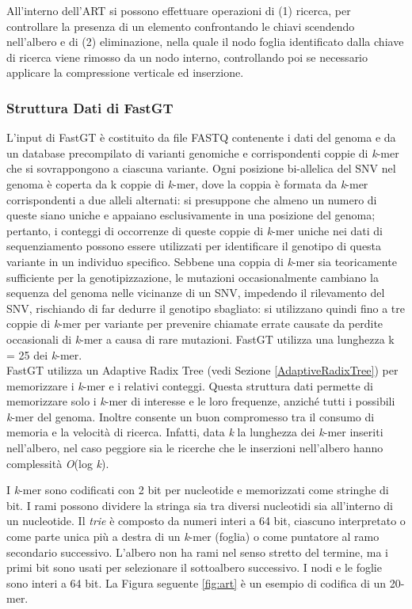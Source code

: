 \documentclass[../main.tex]{subfiles}
\begin{document}
All'interno dell'ART si possono effettuare operazioni di (1) ricerca, per controllare la presenza di un elemento confrontando le chiavi scendendo nell'albero e di (2) eliminazione, nella quale il nodo foglia identificato dalla chiave di ricerca viene rimosso da un nodo interno, controllando poi se necessario applicare la compressione verticale ed inserzione.


\subsubsection{Struttura Dati di FastGT}
\label{strutturaDatiFastGT}

L'input di FastGT è costituito da file FASTQ contenente i dati del genoma e da un database precompilato di varianti genomiche e corrispondenti coppie di \textit{k}-mer che si sovrappongono a ciascuna variante. Ogni posizione bi-allelica del SNV nel genoma è coperta da k coppie di \textit{k}-mer, dove la coppia è formata da \textit{k}-mer corrispondenti a due alleli alternati: si presuppone che almeno un numero di queste siano uniche e appaiano esclusivamente in una posizione del genoma; pertanto, i conteggi di occorrenze di queste coppie di \textit{k}-mer uniche nei dati di sequenziamento possono essere utilizzati per identificare il genotipo di questa variante in un individuo specifico. Sebbene una coppia di \textit{k}-mer sia teoricamente sufficiente per la genotipizzazione, le mutazioni occasionalmente cambiano la sequenza del genoma nelle vicinanze di un SNV, impedendo il rilevamento del SNV, rischiando di far dedurre il genotipo sbagliato: si utilizzano quindi fino a tre coppie di \textit{k}-mer per variante per prevenire chiamate errate causate da perdite occasionali di \textit{k}-mer a causa di rare mutazioni. FastGT utilizza una lunghezza k = 25 dei \textit{k}-mer. \\

\noindent
FastGT utilizza un Adaptive Radix Tree (vedi Sezione \ref{AdaptiveRadixTree}) per memorizzare i \textit{k}-mer e i relativi conteggi. Questa struttura dati permette di memorizzare solo i \textit{k}-mer di interesse e le loro frequenze, anziché tutti i possibili \textit{k}-mer del genoma. Inoltre consente un buon compromesso tra il consumo di memoria e la velocità di ricerca. Infatti, data \textit{k} la lunghezza dei \textit{k}-mer inseriti nell'albero, nel caso peggiore sia le ricerche che le inserzioni nell'albero hanno complessità \textit{O}(log \textit{k}).

I \textit{k}-mer sono codificati con 2 bit per nucleotide e memorizzati come stringhe di bit. I rami possono dividere la stringa sia tra diversi nucleotidi sia all'interno di un nucleotide. Il \textit{trie} è composto da numeri interi a 64 bit, ciascuno interpretato o come parte unica più a destra di un \textit{k}-mer (foglia) o come puntatore al ramo secondario successivo. L'albero non ha rami nel senso stretto del termine, ma i primi bit sono usati per selezionare il sottoalbero successivo. I nodi e le foglie sono interi a 64 bit. La Figura seguente \ref{fig:art} è un esempio di codifica di un 20-mer.
\end{document}
